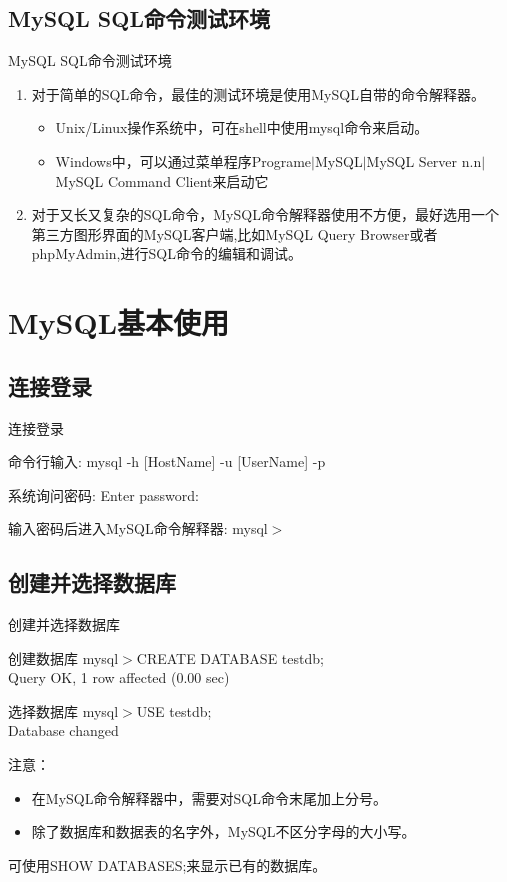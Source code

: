\documentclass[CJK]{beamer}
\begin{document}
\begin{CJK*}{UTF8}{gbsn}
\subsection{MySQL SQL命令测试环境}
\begin{frame}{MySQL SQL命令测试环境}
\begin{enumerate}
	\item 对于简单的SQL命令，最佳的测试环境是使用MySQL自带的命令解释器。
		\begin{itemize}
			\item Unix/Linux操作系统中，可在shell中使用mysql命令来启动。
			\item Windows中，可以通过菜单程序Programe$\mid$MySQL$\mid$MySQL Server n.n$\mid$MySQL Command Client来启动它
		\end{itemize}
	\item 对于又长又复杂的SQL命令，MySQL命令解释器使用不方便，最好选用一个第三方图形界面的MySQL客户端,比如MySQL Query Browser或者phpMyAdmin,进行SQL命令的编辑和调试。
\end{enumerate}
\end{frame}

\section{MySQL基本使用}
\subsection{连接登录}
\begin{frame}{连接登录}
	\begin{block}{命令行输入:}
	mysql -h [HostName] -u [UserName] -p
	\end{block}
	\begin{block}{系统询问密码:}
	Enter password:
	\end{block}
	\begin{block}{输入密码后进入MySQL命令解释器:}
	mysql$>$
	\end{block}
\end{frame}
\subsection{创建并选择数据库}
\begin{frame}{创建并选择数据库}
	\begin{block}{创建数据库}
	mysql$>$CREATE DATABASE testdb;\\
	{\color{blue}Query OK, 1 row affected (0.00 sec)}
	\end{block}
	\begin{block}{选择数据库}
	mysql$>$USE testdb;\\
	{\color{blue}Database changed}
	\end{block}
	注意：
	\begin{itemize}
		\item 在MySQL命令解释器中，需要对SQL命令末尾加上分号。
		\item 除了数据库和数据表的名字外，MySQL不区分字母的大小写。
	\end{itemize}
	{\tiny *可使用SHOW DATABASES;来显示已有的数据库。}
\end{frame}

\end{CJK*}
\end{document}
